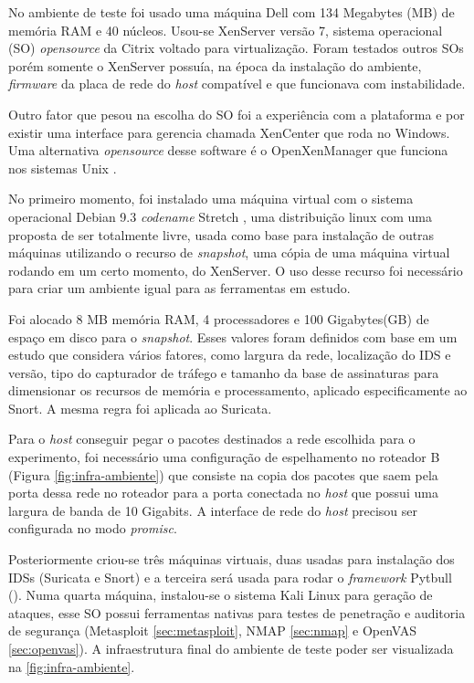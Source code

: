 No ambiente de teste foi usado uma máquina Dell com 134 Megabytes (MB) de memória RAM e 40 núcleos. Usou-se XenServer \cite{xenserver} versão 7, sistema operacional (SO) \textit{opensource} da Citrix voltado para virtualização. Foram testados outros SOs porém somente o XenServer possuía, na época da instalação do ambiente, \textit{firmware} da placa de rede do \textit{host} compatível e que funcionava com instabilidade. 
 
Outro fator que pesou na escolha do SO foi a experiência com a plataforma e por existir uma interface para gerencia chamada XenCenter que roda no Windows. Uma alternativa \textit{opensource} desse software é o OpenXenManager que funciona nos sistemas Unix \cite{openxenmanager}.

No primeiro momento, foi instalado uma máquina virtual com o sistema operacional Debian 9.3 \textit{codename} Stretch \cite{debianwheezy}, uma distribuição linux com uma proposta de ser totalmente livre, usada como base para instalação de outras máquinas utilizando o recurso de \textit{snapshot}, uma cópia de uma máquina virtual rodando em um certo momento, do XenServer. O uso desse recurso foi necessário para criar um ambiente igual para as ferramentas em estudo.

Foi alocado 8 MB memória RAM, 4 processadores e 100 Gigabytes(GB) de espaço em disco para o \textit{snapshot}. Esses valores foram definidos com base em um estudo \cite{mikelococo} que considera vários fatores, como largura da rede, localização do IDS e versão, tipo do capturador de tráfego e tamanho da base de assinaturas para dimensionar os recursos de memória e processamento, aplicado especificamente ao Snort. A mesma regra foi aplicada ao Suricata.

Para o \textit{host} conseguir pegar o pacotes destinados a rede escolhida para o experimento, foi necessário uma configuração de espelhamento no roteador B (Figura \ref{fig:infra-ambiente}) que consiste na copia dos pacotes que saem pela porta dessa rede no roteador para a porta conectada no \textit{host} que possui uma largura de banda de 10 Gigabits. A interface de rede do \textit{host} precisou ser configurada no modo \textit{promisc}.

Posteriormente criou-se três máquinas virtuais, duas usadas para instalação dos IDSs (Suricata e Snort) e a terceira será usada para rodar o \textit{framework} Pytbull (\cite{sec:pytbull}). Numa quarta máquina, instalou-se o sistema Kali Linux \cite{kalilinux} para geração de ataques, esse SO possui ferramentas nativas para testes de penetração e auditoria de segurança (Metasploit \autoref{sec:metasploit}, NMAP \autoref{sec:nmap} e OpenVAS \autoref{sec:openvas}). A infraestrutura final do ambiente de teste poder ser visualizada na \autoref{fig:infra-ambiente}.

